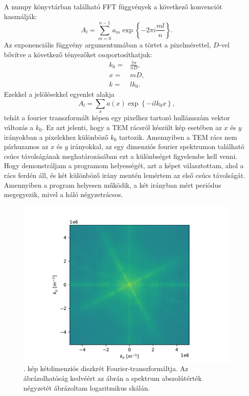 \documentclass[pdftex,12pt,a4paper]{article}
\newcommand{\aeqref}[1]{\az{\eqref{#1}}}
\begin{document}
		A numpy könyvtárban található FFT függvények a következő konvenciót használják:
		\begin{equation}
			A_l = \sum_{m=0}^{n-1}a_m\exp\left\{-2\pi i\frac{ml}{n}\right\}.
			\label{fftconv}
		\end{equation}
		Az exponenciális függvény argumentumában a törtet a pixelmérettel, $D$-vel bővítve a következő tényezőket csoportosíthatjuk:
		\begin{equation}
			\begin{split}
				k_0 =& \frac{2\pi}{nD},\\
				x   =& mD,\\
				k   =& lk_0.
			\end{split}
		\end{equation}
		Ezekkel a jelölésekkel \aeqref{fftconv} egyenlet alakja
		\begin{equation}
			A_l = \sum_x a(x)\exp\left\{-ilk_0x\right\},
		\end{equation}
		tehát a fourier transzformált képen egy pixelhez tartozó hullámszám vektor változás a $k_0$. Ez azt jelenti, hogy a TEM rácsról készült kép esetében az $x$ és $y$ irányokban a pixelekhez különböző $k_0$ tartozik. Amennyiben a TEM rács nem párhuzamos az $x$ és $y$ irányokkal, az egy dimenziós fourier spektrumon található csúcs távolságának meghatározásában ezt a különbséget figyelembe kell venni. Hogy demonstráljam a programom helyességét, azt a képet választottam, ahol a rács ferdén áll, és két különböző irány mentén lemértem az első csúcs távolságát. Amennyiben a program helyesen működik, a két irányban mért periódus megegyezik, mivel a háló négyzetrácsos.
		\begin{figure}[H]
			\centering
			\includegraphics[scale=1]{./figs/2dfft.pdf}
			\caption{. kép kétdimenziós diszkrét Fourier-transzformáltja. Az ábrázolhatóság kedvéért az ábrán a spektrum abszolútérték négyzetét ábrázoltam logaritmikus skálán.}
			\label{2dfft}
		\end{figure}
\end{document}
